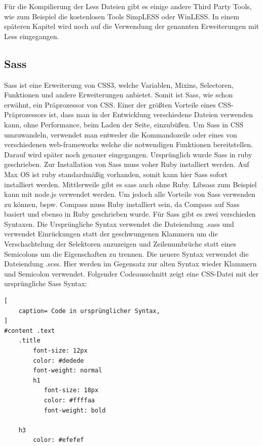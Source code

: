 Für die Kompilierung der Less Dateien gibt es einige andere Third Party Tools, wie zum Beispiel die kostenlosen Tools SimpLESS oder WinLESS.\newline
In einem späteren Kapitel wird noch auf die Verwendung der genannten Erweiterungen mit Less eingegangen.
\newpage
\subsection{Sass}
Sass ist eine Erweiterung von CSS3, welche Variablen, Mixins, Selectoren, Funktionen und andere Erweiterungen anbietet. Somit ist Sass, wie schon erwähnt, ein Präprozessor von CSS.\newline
Einer der größten Vorteile eines CSS-Präprozessors ist, dass man in der Entwicklung verschiedene Dateien verwenden kann, ohne Performance, beim Laden der Seite, einzubüßen.\newline
Um Sass in CSS umzuwandeln, verwendet man entweder die Kommandozeile oder eines von verschiedenen web-frameworks welche die notwendigen Funktionen bereitstellen. Darauf wird später noch genauer eingegangen.\newline
Ursprünglich wurde Sass in ruby geschrieben. Zur Installation von Sass muss voher Ruby installiert werden. Auf Max OS ist ruby standardmäßig vorhanden, somit kann hier Sass sofort installiert werden. Mittlerweile gibt es sass auch ohne Ruby. Libsass zum Beispiel kann mit node.js verwendet werden. \newline
Um jedoch alle Vorteile von Sass verwenden zu können, bspw. Compass muss Ruby installiert sein, da Compass auf Sass basiert und ebenso in Ruby geschrieben wurde.\newline
Für Sass gibt es zwei verschieden Syntaxen. Die Ursprüngliche Syntax verwendet die Dateiendung .sass und verwendet Einrückungen statt der geschwungenen Klammern um die Verschachtelung der Selektoren anzuzeigen und Zeilenumbrüche statt eines Semicolons um die Eigenschaften zu trennen.\newline
Die neuere Syntax verwendet die Dateiendung .scss. Hier werden im Gegensatz zur alten Syntax wieder Klammern und Semicolon verwendet.  \autocite[]{Yard.2014}\newline
Folgender Codeausschnitt zeigt eine CSS-Datei mit der ursprüngliche Sass Syntax:
\begin{lstlisting}[
	caption= Code in ursprünglicher Syntax,
]
#content .text
    .title
        font-size: 12px
        color: #dedede
        font-weight: normal
        h1
           font-size: 18px
           color: #ffffaa
           font-weight: bold
    
    h3
        color: #efefef
    
\end{lstlisting}

